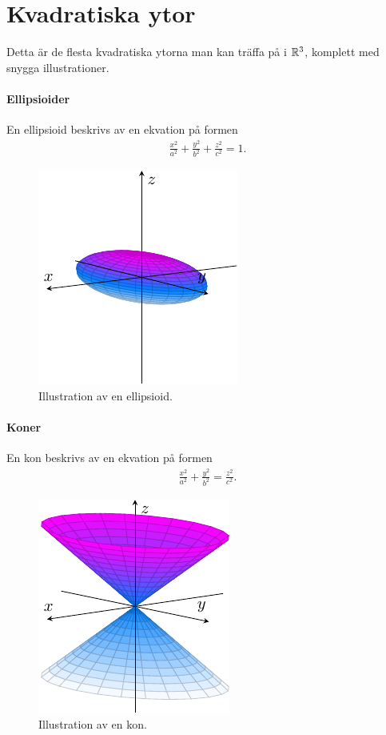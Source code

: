 \section{Kvadratiska ytor}
Detta är de flesta kvadratiska ytorna man kan träffa på i $\mathbb{R}^3$, komplett med snygga illustrationer.

\paragraph{Ellipsioider}
En ellipsioid beskrivs av en ekvation på formen
\begin{align*}
	\frac{x^2}{a^2} + \frac{y^2}{b^2} + \frac{z^2}{c^2} = 1.
\end{align*}

\begin{figure}[!ht]
	\centering
	\includegraphics[scale=1]{./Images/quadric_surfaces/ellipsioid/ellipsioid.pdf}
	\caption{Illustration av en ellipsioid.}
	\label{fig:ellipsioid}
\end{figure}

\paragraph{Koner}
En kon beskrivs av en ekvation på formen
\begin{align*}
	\frac{x^2}{a^2} + \frac{y^2}{b^2} = \frac{z^2}{c^2}.
\end{align*}
\begin{figure}[!ht]
	\centering
	\includegraphics[scale=1]{./Images/quadric_surfaces/cone/cone.pdf}
	\caption{Illustration av en kon.}
	\label{fig:cone}
\end{figure}

